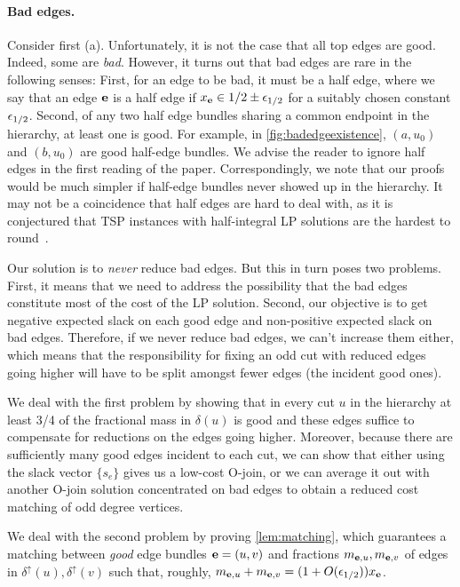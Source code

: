 \paragraph{Bad edges.} Consider first (a). Unfortunately, it is not the case that all top edges are good. Indeed, some are {\em bad}.  However, it turns out that bad edges are rare in the following senses: First, for an edge  to be bad, it must be a half edge, where we say that an edge ${\bf e}$ is a half edge if  $x_{\bf e} \in 1/2 \pm {\epsilon}_{1/2}$ for a suitably chosen constant ${\epsilon}_{1/2}$. Second, of any two half edge bundles sharing a common endpoint in the hierarchy, at least one is good. For example, in \cref{fig:badedgeexistence}, $(a,u_0)$ and $(b,u_0)$ are good half-edge bundles. We advise the reader to ignore half edges in the first reading of the paper. Correspondingly, we note that our proofs would be much simpler if half-edge bundles never showed up in the hierarchy. It may not be a coincidence that half edges are hard to deal with, as it is conjectured that TSP instances with half-integral LP solutions are the hardest to round~\cite{SWV12,SWvZ13}.

Our solution is to {\em never} reduce bad edges. But this in turn poses two problems. First, it means that we need to address the possibility that the bad edges constitute most of the cost of the LP solution. Second, our objective is to get negative expected slack on each good edge and non-positive expected slack on bad edges. Therefore, if we never reduce bad edges, we can't increase them either, which means that the responsibility for fixing an odd cut with reduced edges going higher will have to be split amongst fewer edges (the incident good ones). 


We deal with the first problem by showing that 
in every cut $u$ in the hierarchy at least 3/4 of the fractional mass in $\delta(u)$ is good and these edges suffice to compensate for reductions on the edges going higher. Moreover, because  there are sufficiently many good edges incident to each cut, we can show that either using the slack vector $\{s_e\}$ gives us a low-cost O-join, or we can average it out with another O-join solution concentrated on bad edges to obtain a reduced cost matching of odd degree vertices.

We deal with the second problem by proving \cref{lem:matching}, which guarantees a matching between  {\em good} edge bundles ${\bf e} = (u,v)$ and fractions $m_{{\bf e},u}, m_{{\bf e},v}$ of edges in $\delta^\uparrow(u), \delta^\uparrow(v)$ such that, roughly, $m_{{\bf e},u} + m_{{\bf e},v} = (1 + O({\epsilon}_{1/2}))x_{\bf e}$. 


